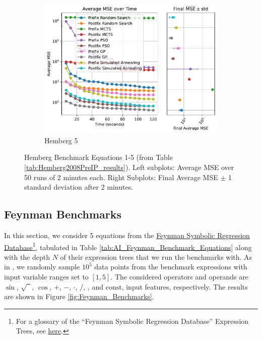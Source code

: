 \documentclass[runningheads]{llncs}
\newcommand\specialcaret{%
  \stackengine{0pt}{\ \,}{\scalebox{1.1}[2]{\raisebox{-0.9ex}{\string^}}}{O}{c}{F}{T}{L}}
\begin{document}
\begin{figure}
    \vspace{0.4cm}
    \begin{subfigure}[b]{0.4\textwidth}
        \includegraphics[width=\linewidth, keepaspectratio]{Hemberg_Benchmarks/Hemberg_Benchmark_5.pdf}
        \caption{Hemberg 5}
        \label{subfig:hemberg_5}
    \end{subfigure}
    
    \caption{Hemberg Benchmark Equations 1-5 (from Table \ref{tab:Hemberg2008PreIP_results}). Left subplots: Average MSE over 50 runs of 2 minutes each. Right Subplots: Final Average MSE $\pm$ 1 standard deviation after 2 minutes.}
    \label{fig:Hemberg_Benchmarks}
\end{figure}

\subsection{Feynman Benchmarks} \label{subsec:FeynmanBenchmarks}
In this section, we consider 5 equations from the \href{https://space.mit.edu/home/tegmark/aifeynman.html}{Feynman Symbolic Regression Database}\footnote{For a glossary of the ``Feynman Symbolic Regression Database'' Expression Trees, see \href{https://edfink234.github.io/AIFeynmanExpressionTrees/AIFeynmanExpressionTrees/AIFeynmanExpressionTrees}{here}.}, tabulated in Table \ref{tab:AI_Feynman_Benchmark_Equations} along with the depth $N$ of their expression trees that we run the benchmarks with. As in \cite{udrescu2020ai}, we randomly sample $10^5$ data points from the benchmark expressions with input variable ranges set to $[1, 5]$. The considered operators and operands are $\sin$, $\sqrt{\phantom{1}}$, $\cos$, $+$, $-$, $\cdot$, $/$, \specialcaret, and $\mathrm{const}$, input features, respectively. The results are shown in Figure \ref{fig:Feynman_Benchmarks}.
\end{document}
